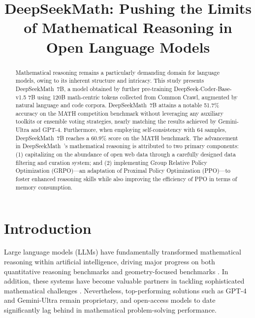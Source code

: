 \title{DeepSeekMath: Pushing the Limits of Mathematical Reasoning in Open Language Models}

\begin{abstract}
Mathematical reasoning remains a particularly demanding domain for language models, owing to its inherent structure and intricacy. This study presents DeepSeekMath~7B, a model obtained by further pre-training DeepSeek-Coder-Base-v1.5 7B using 120B math-centric tokens collected from Common Crawl, augmented by natural language and code corpora. DeepSeekMath~7B attains a notable 51.7\% accuracy on the MATH competition benchmark without leveraging any auxiliary toolkits or ensemble voting strategies, nearly matching the results achieved by Gemini-Ultra and GPT-4. Furthermore, when employing self-consistency with 64 samples, DeepSeekMath~7B reaches a 60.9\% score on the MATH benchmark. The advancement in DeepSeekMath~’s mathematical reasoning is attributed to two primary components: (1) capitalizing on the abundance of open web data through a carefully designed data filtering and curation system; and (2) implementing Group Relative Policy Optimization (GRPO)—an adaptation of Proximal Policy Optimization (PPO)—to foster enhanced reasoning skills while also improving the efficiency of PPO in terms of memory consumption.
\end{abstract}

\section{Introduction}

Large language models (LLMs) have fundamentally transformed mathematical reasoning within artificial intelligence, driving major progress on both quantitative reasoning benchmarks \citep{MATH} and geometry-focused benchmarks \citep{trinh2024solving}. In addition, these systems have become valuable partners in tackling sophisticated mathematical challenges \citep{tao}. Nevertheless, top-performing solutions such as GPT-4 \citep{gpt4} and Gemini-Ultra \citep{gemini} remain proprietary, and open-access models to date significantly lag behind in mathematical problem-solving performance.

